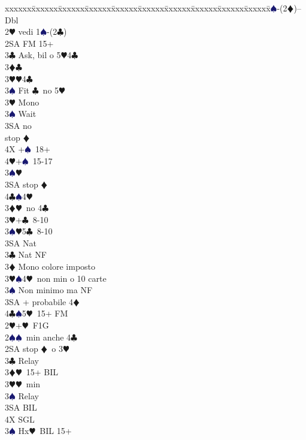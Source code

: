 \documentclass[a4paper,italian]{article}
\newcommand{\BC}{\textcolor{OliveGreen}{$\clubsuit$}}
\newcommand{\BD}{\textcolor{RedOrange}{$\vardiamondsuit$}}
\newcommand{\BH}{\textcolor{Red2}{$\varheartsuit${}}}
\newcommand{\BS}{\textcolor{MidnightBlue}{$\spadesuit${}}}
\newenvironment{bidtable}
{\begin{tabbing}

    xxxxxx\=xxxxxx\=xxxxxx\=xxxxxx\=xxxxxx\=xxxxxx\=xxxxxx\=xxxxxx\=xxxxxx\=xxxxxx\=\kill}
{\end{tabbing} }%
\begin{document}
\begin{multicols}{2}
    \begin{bidtable}
        1\BS-(2\BD)--\+\\
        Dbl\+\\
        2\BH \> vedi 1\BS -(2\BC )\\
        2SA \> FM 15+\+\\
        3\BC \> Ask, bil o 5\BH4\BC\+\\
        3\BD {}\BC \+\\
        3\BH {}\BH 4\BC \\
        3\BS \> Fit \BC\ no 5\BH \-\\
        3\BH \> Mono\+\\
        3\BS \> Wait\+\\
        3SA  no\+\\\-stop \BD \\
        4X +\BS\ 18+\\
        4\BH {}+\BS\ 15-17\-\-\\
        3\BS {}\BH \\
        3SA  stop \BD \\
        4\BC {}\BS 4\BH \-\\
        3\BD {}\BH\ no 4\BC \\
        3\BH {}+\BC\ 8-10\\
        3\BS {}\BH 5\BC\ 8-10\\
        3SA \> Nat\-\\
        3\BC \> Nat NF\\
        3\BD \> Mono colore imposto\\
        3\BH {}\BS 4\BH\ non min o 10 carte\\
        3\BS \> Non minimo ma NF\\
        3SA + probabile 4\BD \\
        4\BC {}\BS 5\BH\ 15+ FM\-\\
        2\BH {}+\BH\ F1G\+\\
        2\BS {}\BS\ min anche 4\BC \\
        2SA  stop \BD\ o 3\BH \+\\
        3\BC \> Relay\+\\
        3\BD {}\BH\ 15+ BIL\\
        3\BH {}\BH\ min\+\\
        3\BS \> Relay\+\\
        3SA \> BIL\\
        4X \> SGL\-\-\\
        3\BS \> Hx\BH\ BIL 15+\\

\end{bidtable}
\end{multicols}
\end{document}
